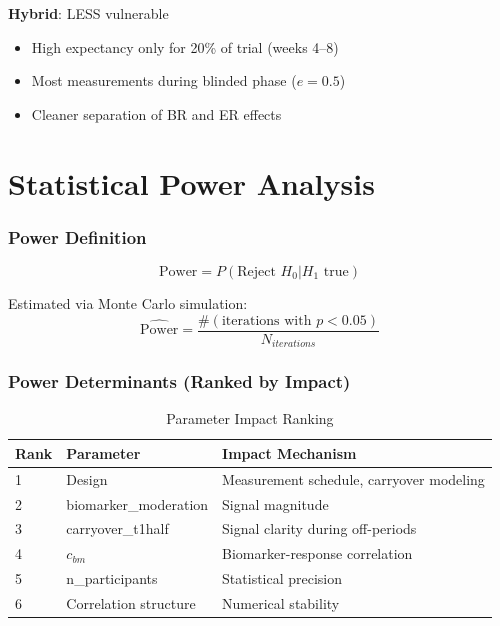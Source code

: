 \documentclass[11pt]{article}
\theoremstyle{definition}
\begin{document}
\textbf{Hybrid}: LESS vulnerable
\begin{itemize}
    \item High expectancy only for 20\% of trial (weeks 4--8)
    \item Most measurements during blinded phase ($e=0.5$)
    \item Cleaner separation of BR and ER effects
\end{itemize}

\part{Statistical Power Analysis}

\section{Power Definition}

\begin{equation}
\text{Power} = P(\text{Reject } H_0 | H_1 \text{ true})
\end{equation}

Estimated via Monte Carlo simulation:
\begin{equation}
\hat{\text{Power}} = \frac{\#(\text{iterations with } p < 0.05)}{N_{iterations}}
\end{equation}

\section{Power Determinants (Ranked by Impact)}

\begin{table}[h]
\centering
\caption{Parameter Impact Ranking}
\begin{tabular}{@{}lll@{}}
\toprule
\textbf{Rank} & \textbf{Parameter} & \textbf{Impact Mechanism} \\
\midrule
1 & Design & Measurement schedule, carryover modeling \\
2 & biomarker\_moderation & Signal magnitude \\
3 & carryover\_t1half & Signal clarity during off-periods \\
4 & $c_{bm}$ & Biomarker-response correlation \\
5 & n\_participants & Statistical precision \\
6 & Correlation structure & Numerical stability \\
\bottomrule
\end{tabular}
\end{table}
\end{document}
